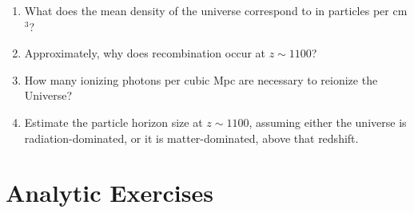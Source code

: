 \begin{enumerate} 
\item What does the mean density of the universe correspond to in
    particles per cm$^3$?
\item Approximately, why does recombination occur at $z\sim 1100$?
\item How many ionizing photons per cubic Mpc are necessary to
reionize the Universe?
\item Estimate the particle horizon size at $z\sim 1100$, assuming
either the universe is radiation-dominated, or it is matter-dominated,
above that redshift.
\end{enumerate} 

\section{Analytic Exercises}


